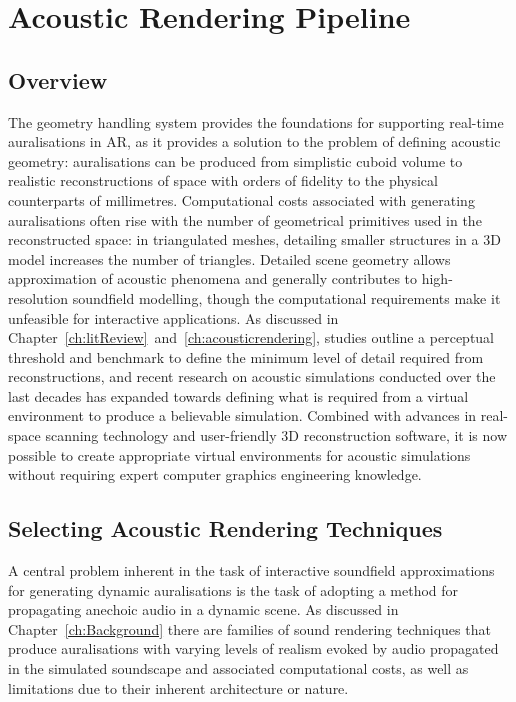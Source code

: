 \section{Acoustic Rendering Pipeline}

\subsection{Overview}
The geometry handling system provides the foundations for supporting real-time auralisations in AR, as it provides a solution to the problem of defining acoustic geometry: auralisations can be produced from simplistic cuboid volume to realistic reconstructions of space with orders of fidelity to the physical counterparts of millimetres. Computational costs associated with generating auralisations often rise with the number of geometrical primitives used in the reconstructed space: in triangulated meshes, detailing smaller structures in a 3D model increases the number of triangles. Detailed scene geometry allows approximation of acoustic phenomena and generally contributes to high-resolution soundfield modelling, though the computational requirements make it unfeasible for interactive applications. As discussed in Chapter~\ref{ch:litReview}~and~\ref{ch:acousticrendering}, studies outline a perceptual threshold and benchmark to define the minimum level of detail required from reconstructions, and recent research on acoustic simulations conducted over the last decades has expanded towards defining what is required from a virtual environment to produce a believable simulation. Combined with advances in real-space scanning technology and user-friendly 3D reconstruction software, it is now possible to create appropriate virtual environments for acoustic simulations without requiring expert computer graphics engineering knowledge.\par

\subsection{Selecting Acoustic Rendering Techniques}
A central problem inherent in the task of interactive soundfield approximations for generating dynamic auralisations is the task of adopting a method for propagating anechoic audio in a dynamic scene. As discussed in Chapter~\ref{ch:Background} there are families of sound rendering techniques that produce auralisations with varying levels of realism evoked by audio propagated in the simulated soundscape and associated computational costs, as well as limitations due to their inherent architecture or nature.

